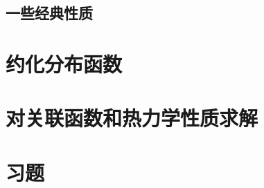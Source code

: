 \documentclass[AutoFakeBold]{tstextbook}
\begin{document}
\subsection{一些经典性质} %
\label{sub:一些经典性质}

\section{约化分布函数} %
\label{sec:约化分布函数}

\section{对关联函数和热力学性质求解} %
\label{sec:对关联函数和热力学性质求解}

\section{习题} %
\label{sec:习题14}

\end{document}
